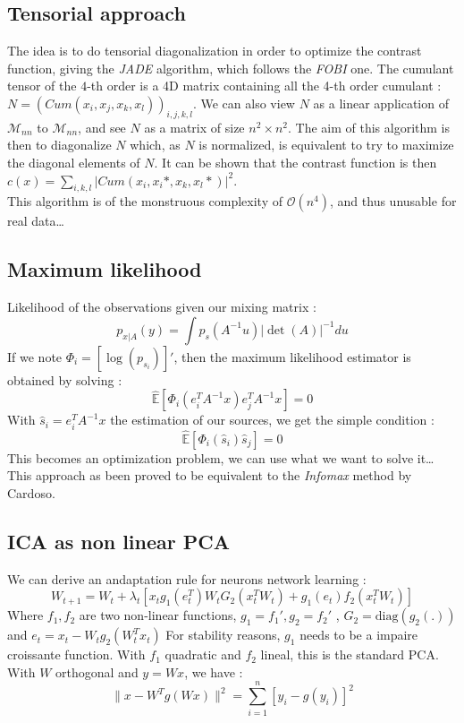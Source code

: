 \documentclass[a4paper,11pt,titlepage]{article}
\begin{document}
\subsection{Tensorial approach}
\label{TA}
The idea is to do tensorial diagonalization in order to optimize the contrast function, giving the \textit{JADE} algorithm, which follows the \textit{FOBI} one. The cumulant tensor of the $4$-th order is a 4D matrix containing all the 4-th order cumulant :$N =(Cum(x_i,x_j,x_k,x_l))_{i,j,k,l}$. We can also view $N$ as a linear application of $\mathcal{M}_{nn}$ to $\mathcal{M}_{nn}$, and see $N$ as a matrix of size $n^2 \times n^2$.
The aim of this algorithm is then to diagonalize $N$ which, as $N$ is normalized, is equivalent to try to maximize the diagonal elements of $N$. It can be shown that the contrast function is then $c(x) =\sum\limits_{i,k,l} |Cum(x_i,x_i*,x_k,x_l*)|^2$.\\
This algorithm is of the monstruous complexity of $\mathcal{O}(n^4)$, and thus unusable for real data\dots

\subsection{Maximum likelihood}
Likelihood of the observations given our mixing matrix :
\begin{equation*}
	p_{x|A}(y) = \int p_s(A^{-1}u)|\det(A)|^{-1}du
\end{equation*}
If we note $\Phi_i = [\log(p_{s_i})]'$, then the maximum likelihood estimator is obtained by solving :
\begin{equation*}
	\hat{\mathds{E}}[\Phi_i(e_i^TA^{-1}x)e_j^TA^{-1}x] = 0
\end{equation*}
With $\hat{s}_i= e_i^TA^{-1}x$ the estimation of our sources, we get the simple condition :
\begin{equation*}
	\hat{\mathds{E}}[\Phi_i(\hat{s}_i)\hat{s}_j] = 0
\end{equation*}
This becomes an optimization problem, we can use what we want to solve it\dots
This approach as been proved to be equivalent to the \textit{Infomax} method by Cardoso.


\subsection{ICA as non linear PCA}
We can derive an andaptation rule for neurons network learning :
\begin{equation*}
	W_{t+1} = W_t +\lambda_t [x_t g_1(e_t^T)W_t G_2(x_t^TW_t)+ g_1(e_t)f_2(x_t^TW_t)]
\end{equation*}
Where $f_1,f_2$ are two non-linear functions, $g_1 = f_1',g_2=f_2'$ , $G_2 = \text{diag}(g_2(.))$ and $e_t = x_t-W_tg_2(W_t^Tx_t)$
For stability reasons, $g_1$ needs to be a impaire croissante function. With $f_1$ quadratic and $f_2$ lineal, this is the standard PCA.\\
With $W$ orthogonal and $y=Wx$, we have :
\begin{equation*}
	\| x-W^Tg(Wx) \|^2 = \sum\limits_{i=1}^n [y_i-g(y_i)]^2
\end{equation*}
\end{document}
